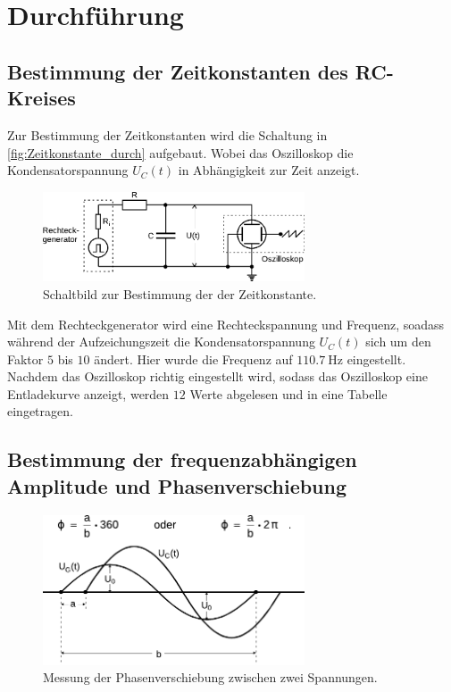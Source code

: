 \section{Durchführung}
\label{sec:Durchführung}

\subsection{Bestimmung der Zeitkonstanten des RC-Kreises} %
\label{sub:Zeitkonstante_durch}
Zur Bestimmung der Zeitkonstanten wird die Schaltung in \autoref{fig:Zeitkonstante_durch} aufgebaut.
Wobei das Oszilloskop die Kondensatorspannung $U_C(t)$ in Abhängigkeit zur Zeit anzeigt.
\begin{figure}[H]
    \centering
    \includegraphics[width=0.69\textwidth]{build/Abb_3.pdf}
    \caption{Schaltbild zur Bestimmung der der Zeitkonstante.\cite{v353}}
    \label{fig:Zeitkonstante_durch}
\end{figure}
\noindent Mit dem Rechteckgenerator wird eine Rechteckspannung und Frequenz, soadass während der Aufzeichungszeit die Kondensatorspannung $U_C(t)$ sich um den Faktor $5$ bis $10$ ändert.
Hier wurde die Frequenz auf $\qty{110,7}{\hertz}$ eingestellt.
Nachdem das Oszilloskop richtig eingestellt wird, sodass das Oszilloskop eine Entladekurve anzeigt, werden $12$ Werte abgelesen und in eine Tabelle eingetragen. 
\subsection{Bestimmung der frequenzabhängigen Amplitude und Phasenverschiebung} %
\label{sub:Freque_A&P_durch}
\begin{figure}[H]
    \centering
    \includegraphics[width=0.69\textwidth]{build/Abb_7.pdf}
    \caption {Messung der Phasenverschiebung zwischen zwei Spannungen.\cite{v353}}
    \label{fig:Freque_A&P_durch}
  \end{figure}

